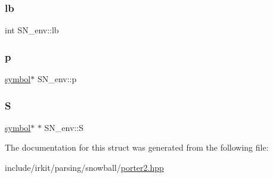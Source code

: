 \subsubsection{\texorpdfstring{lb}{lb}}
{\footnotesize\ttfamily int S\+N\+\_\+env\+::lb}

\mbox{\label{structSN__env_a400280a08e61d3139b32bf9ac06eac59}} 
\subsubsection{\texorpdfstring{p}{p}}
{\footnotesize\ttfamily \mbox{\hyperlink{porter2_8hpp_a04438e24473719aaf288c57833717164}{symbol}}$\ast$ S\+N\+\_\+env\+::p}

\mbox{\label{structSN__env_aef140037972032bceeebebf53cc53d68}} 
\subsubsection{\texorpdfstring{S}{S}}
{\footnotesize\ttfamily \mbox{\hyperlink{porter2_8hpp_a04438e24473719aaf288c57833717164}{symbol}}$\ast$ $\ast$ S\+N\+\_\+env\+::S}



The documentation for this struct was generated from the following file\+:\begin{DoxyCompactItemize}
\item 
include/irkit/parsing/snowball/\mbox{\hyperlink{porter2_8hpp}{porter2.\+hpp}}\end{DoxyCompactItemize}
